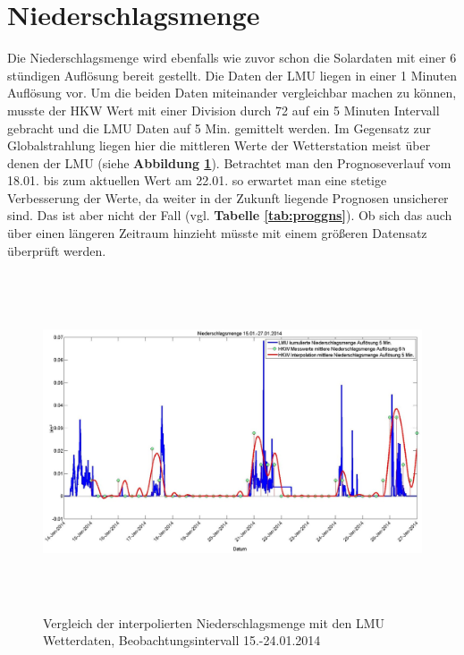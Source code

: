 \section{Niederschlagsmenge}
Die Niederschlagsmenge wird ebenfalls wie zuvor schon die Solardaten mit einer 6 stündigen Auflösung bereit gestellt. Die Daten der LMU liegen in einer 1 Minuten Auflösung vor. Um die beiden Daten miteinander vergleichbar machen zu können, musste der HKW Wert mit einer Division durch 72 auf ein 5 Minuten Intervall gebracht und die LMU Daten auf 5 Min. gemittelt werden. Im Gegensatz zur Globalstrahlung liegen hier die mittleren Werte der Wetterstation meist über denen der LMU (siehe \textbf{Abbildung \ref{fig:niedersmenge}}). Betrachtet man den Prognoseverlauf vom 18.01. bis zum aktuellen Wert am 22.01. so erwartet man eine stetige Verbesserung der Werte, da weiter in der Zukunft liegende Prognosen unsicherer sind. Das ist aber nicht der Fall (vgl. \textbf{Tabelle \ref{tab:proggns}}). Ob sich das auch über einen längeren Zeitraum hinzieht müsste mit einem größeren Datensatz überprüft werden. 
\begin{figure}[htbp]
\centering
\includegraphics[width=16cm,height=10cm]{analyse/niedersmenge2}
\caption{Vergleich der interpolierten Niederschlagsmenge mit den LMU Wetterdaten, Beobachtungsintervall 15.-24.01.2014}
\label{fig:niedersmenge}
\end{figure}
